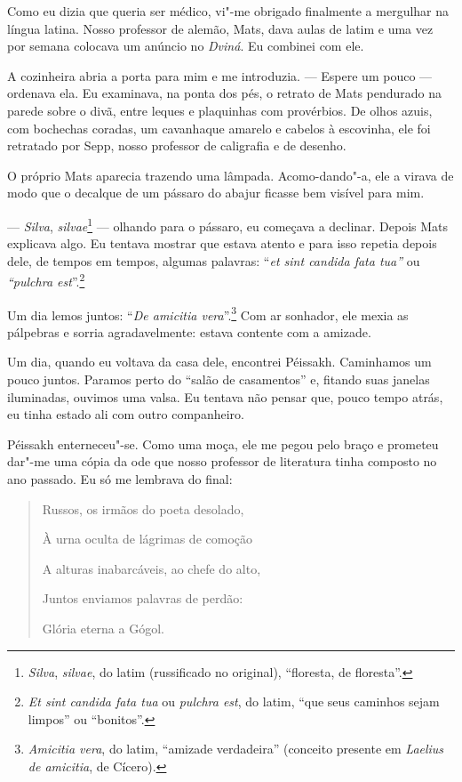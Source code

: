 Como eu dizia que queria ser médico, vi"-me obrigado finalmente a
mergulhar na língua latina. Nosso professor de alemão, Mats, dava aulas
de latim e uma vez por semana colocava um anúncio no \emph{Dviná}. Eu
combinei com ele.

A cozinheira abria a porta para mim e me introduzia. --- Espere um pouco
--- ordenava ela. Eu examinava, na ponta dos pés, o retrato de Mats
pendurado na parede sobre o divã, entre leques e plaquinhas com
provérbios. De olhos azuis, com bochechas coradas, um cavanhaque amarelo
e cabelos à escovinha, ele foi retratado por Sepp, nosso professor de
caligrafia e de desenho.

O próprio Mats aparecia trazendo uma lâmpada. Acomo-dando"-a, ele a virava
de modo que o decalque de um pássaro do abajur ficasse bem visível para
mim.

--- \emph{Silva}, \emph{silvae}\footnote{\emph{Silva}, \emph{silvae}, do
  latim (russificado no original), ``floresta, de floresta''.} ---
olhando para o pássaro, eu começava a declinar. Depois Mats explicava
algo. Eu tentava mostrar que estava atento e para isso repetia depois
dele, de tempos em tempos, algumas palavras: ``\emph{et sint candida
fata tua''} ou \emph{``pulchra est}''.\footnote{\emph{Et sint candida
  fata tua} ou \emph{pulchra est}, do latim, ``que seus caminhos sejam
  limpos'' ou ``bonitos''.}

Um dia lemos juntos: ``\emph{De amicitia vera}''.\footnote{\emph{Amicitia
  vera}, do latim, ``amizade verdadeira'' (conceito presente em
  \emph{Laelius de amicitia}, de Cícero).} Com ar sonhador, ele mexia as
pálpebras e sorria agradavelmente: estava contente com a amizade.

Um dia, quando eu voltava da casa dele, encontrei Péissakh. Caminhamos
um pouco juntos. Paramos perto do ``salão de casamentos'' e, fitando
suas janelas iluminadas, ouvimos uma valsa. Eu tentava não pensar que,
pouco tempo atrás, eu tinha estado ali com outro companheiro.

Péissakh enterneceu"-se. Como uma moça, ele me pegou pelo braço e
prometeu dar"-me uma cópia da ode que nosso professor de literatura tinha
composto no ano passado. Eu só me lembrava do final:

\begin{quotation}
Russos, os irmãos do poeta desolado,

À urna oculta de lágrimas de comoção

A alturas inabarcáveis, ao chefe do alto,

Juntos enviamos palavras de perdão:

Glória eterna a Gógol.
\end{quotation}

